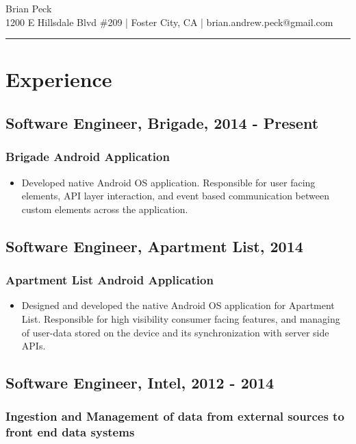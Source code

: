\documentclass[11pt]{article}
\title{}
\date{}
\begin{document}
\begin{center}
{\huge Brian Peck} \\
1200 E Hillsdale Blvd \#209 | Foster City, CA | brian.andrew.peck@gmail.com
\hrule
\end{center}

\section*{Experience}
\label{sec-1}
\subsection*{Software Engineer, Brigade, 2014 - Present}
\label{sec-1-1}
\subsubsection*{Brigade Android Application}
\label{sec-1-1-1}

\begin{itemize}
\item Developed native Android OS application. Responsible for user facing elements, API layer interaction, and event based communication between custom elements across the application.
\end{itemize}
\subsection*{Software Engineer, Apartment List, 2014}
\label{sec-1-2}
\subsubsection*{Apartment List Android Application}
\label{sec-1-2-1}

\begin{itemize}
\item Designed and developed the native Android OS application for Apartment List. Responsible for high visibility consumer facing features, and managing of user-data stored on the device and its synchronization with server side APIs.
\end{itemize}
\subsection*{Software Engineer, Intel, 2012 - 2014}
\label{sec-1-3}
\subsubsection*{Ingestion and Management of data from external sources to front end data systems}
\label{sec-1-3-1}
\end{document}
